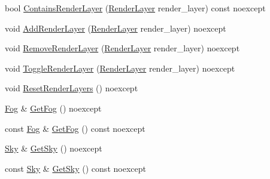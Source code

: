 \begin{DoxyCompactItemize}
\item 
bool \mbox{\hyperlink{classmage_1_1rendering_1_1_camera_settings_aab59f8b20a5d05fd23fff006ef741dac}{Contains\+Render\+Layer}} (\mbox{\hyperlink{namespacemage_1_1rendering_a466c2a441ea5b26e4625c2f34e021b3d}{Render\+Layer}} render\+\_\+layer) const noexcept
\item 
void \mbox{\hyperlink{classmage_1_1rendering_1_1_camera_settings_a921ff9ebe3ff05890f0e3dd8b71fcb7f}{Add\+Render\+Layer}} (\mbox{\hyperlink{namespacemage_1_1rendering_a466c2a441ea5b26e4625c2f34e021b3d}{Render\+Layer}} render\+\_\+layer) noexcept
\item 
void \mbox{\hyperlink{classmage_1_1rendering_1_1_camera_settings_a49c766f4880c798a90a9b8fe488a6711}{Remove\+Render\+Layer}} (\mbox{\hyperlink{namespacemage_1_1rendering_a466c2a441ea5b26e4625c2f34e021b3d}{Render\+Layer}} render\+\_\+layer) noexcept
\item 
void \mbox{\hyperlink{classmage_1_1rendering_1_1_camera_settings_a95c531aba7bbddba9ea47000de3c53b2}{Toggle\+Render\+Layer}} (\mbox{\hyperlink{namespacemage_1_1rendering_a466c2a441ea5b26e4625c2f34e021b3d}{Render\+Layer}} render\+\_\+layer) noexcept
\item 
void \mbox{\hyperlink{classmage_1_1rendering_1_1_camera_settings_a954a0af8d7939069e32b77abc23f95d0}{Reset\+Render\+Layers}} () noexcept
\item 
\mbox{\hyperlink{classmage_1_1rendering_1_1_fog}{Fog}} \& \mbox{\hyperlink{classmage_1_1rendering_1_1_camera_settings_a47b2b9eeca9d9eec61a7e290e1abfa43}{Get\+Fog}} () noexcept
\item 
const \mbox{\hyperlink{classmage_1_1rendering_1_1_fog}{Fog}} \& \mbox{\hyperlink{classmage_1_1rendering_1_1_camera_settings_acd360516b025b09c2ac668f48d6259c7}{Get\+Fog}} () const noexcept
\item 
\mbox{\hyperlink{classmage_1_1rendering_1_1_sky}{Sky}} \& \mbox{\hyperlink{classmage_1_1rendering_1_1_camera_settings_a3538572fc79fa03380cb9ed8cceeba42}{Get\+Sky}} () noexcept
\item 
const \mbox{\hyperlink{classmage_1_1rendering_1_1_sky}{Sky}} \& \mbox{\hyperlink{classmage_1_1rendering_1_1_camera_settings_a0045fb85eafcb33dff43c04656c4cc3b}{Get\+Sky}} () const noexcept
\end{DoxyCompactItemize}
